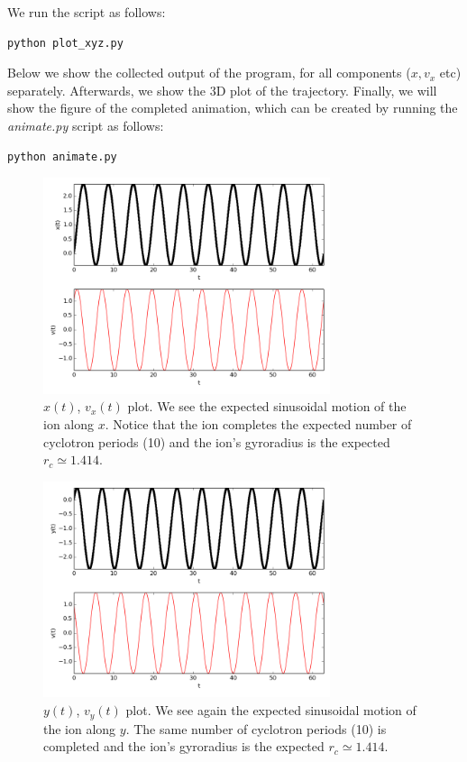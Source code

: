 \documentclass[11pt]{report}
\begin{document}
We run the script as follows:

\begin{lstlisting}
python plot_xyz.py
\end{lstlisting}

Below we show the collected output of the program, for all components ($x, v_x$ etc) separately. Afterwards, we show the 3D plot of the trajectory. Finally, we will show the figure of the completed animation, which can be created by running the \emph{animate.py} script as follows:

\begin{lstlisting}
python animate.py
\end{lstlisting}

\begin{figure}[!ht]
  \centering
    \includegraphics[width=0.75\textwidth]{images/gyro_ion_x}
    \caption{$x(t)$, $v_x(t)$ plot. We see the expected sinusoidal motion of the ion along $x$. Notice that the ion completes the expected number of cyclotron periods (10) and the ion's gyroradius is the expected $r_c \simeq 1.414$.}
\end{figure}

\begin{figure}[!ht]
  \centering
    \includegraphics[width=0.75\textwidth]{images/gyro_ion_y}
     \caption{$y(t)$, $v_y(t)$ plot. We see again the expected sinusoidal motion of the ion along $y$. The same number of cyclotron periods (10) is completed and the ion's gyroradius is the expected $r_c \simeq 1.414$.}
\end{figure}
\end{document}
